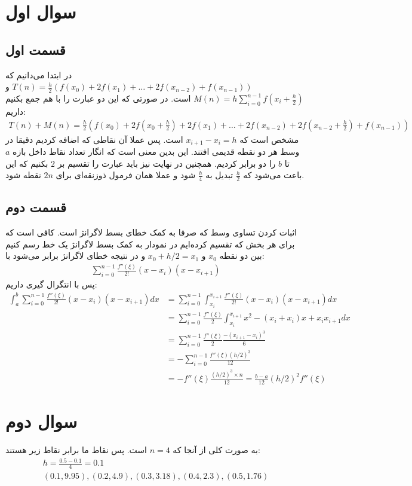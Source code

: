 \documentclass[]{article}
\begin{document}
\printheader

\section*{سوال اول}
\subsection*{قسمت اول}
در ابتدا می‌دانیم که
$T(n) = \frac{h}{2}(f(x_0) + 2f(x_1) + \dots + 2f(x_{n-2}) + f(x_{n-1}))$
و
$M(n) = h \sum_{i=0}^{n-1} f(x_i + \frac{h}{2})$
است. در صورتی که این دو عبارت را با هم جمع بکنیم داریم:
\begin{gather*}
    T(n) + M(n) = \frac{h}{2}(f(x_0) + 2f(x_0 + \frac{h}{2}) + 2f(x_1) + \dots + 2f(x_{n-2}) + 2f(x_{n-2} + \frac{h}{2}) + f(x_{n-1}))
\end{gather*}
مشخص است که
$x_{i+1} - x_i = h$
است. پس عملا آن نقاطی که اضافه کردیم دقیقا در وسط هر دو نقطه قدیمی افتند. این بدین معنی
است که انگار تعداد نقاط داخل بازه
$a$ تا $b$
را دو برابر کردیم. همچنین در نهایت نیز باید عبارت را تقسیم بر
$2$
بکنیم که این باعث می‌شود که
$\frac{h}{2}$ تبدیل به $\frac{h}{4}$
شود و عملا همان فرمول ذوزنقه‌ای برای
$2n$
نقطه شود.
\subsection*{قسمت دوم}
اثبات کردن تساوی وسط که صرفا به کمک خطای بسط لاگرانژ است. کافی است که برای هر بخش که تقسیم کرده‌ایم
در نمودار به کمک بسط لاگرانژ یک خط رسم کنیم بین دو نقطه
$x_0$ و $x_0 + h/2 = x_1$
و در نتیجه خطای لاگرانژ برابر می‌شود با:
\begin{gather*}
    \sum_{i=0}^{n-1} \frac{f''(\xi)}{2!} (x - x_i) (x - x_{i+1})
\end{gather*}
پس با انتگرال گیری داریم:
\begin{align*}
    \int_{a}^{b} \sum_{i=0}^{n-1} \frac{f''(\xi)}{2!} (x - x_i) (x - x_{i+1}) dx &=
    \sum_{i=0}^{n-1} \int_{x_i}^{x_{i+1}} \frac{f''(\xi)}{2!} (x - x_i) (x - x_{i+1}) dx\\
    &= \sum_{i=0}^{n-1} \frac{f''(\xi)}{2} \int_{x_i}^{x_{i+1}} x^2 - (x_i + x_i)x + x_i x_{i+1} dx\\
    &= \sum_{i=0}^{n-1} \frac{f''(\xi)}{2} \frac{-(x_{i+1} - x_i)^3}{6}\\
    &= -\sum_{i=0}^{n-1} \frac{f''(\xi)(h/2)^3}{12}\\
    &= -f''(\xi)\frac{(h/2)^3\times n}{12} = \boxed{\frac{b - a}{12} (h/2)^2 f''(\xi)}
\end{align*}
\section*{سوال دوم}
به صورت کلی از آنجا که
$n = 4$
است. پس نقاط ما برابر نقاط زیر هستند:
\begin{gather*}
    h = \frac{0.5 - 0.1}{4} = 0.1\\
    (0.1, 9.95), (0.2, 4.9), (0.3, 3.18), (0.4, 2.3), (0.5, 1.76)
\end{gather*}
\end{document}
